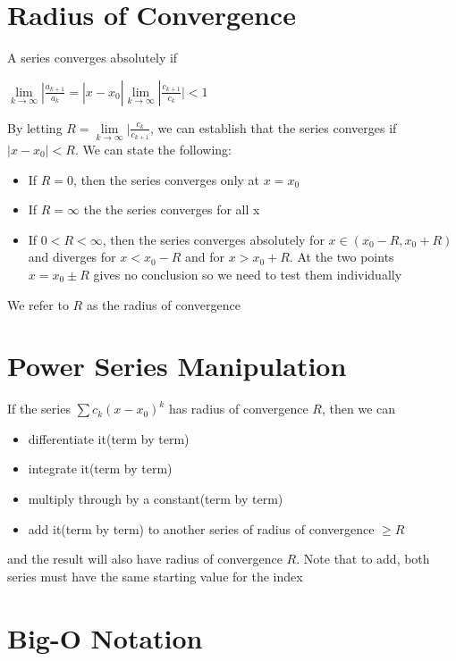 \documentclass[12pt]{report}
\begin{document}
	\section{Radius of Convergence}
		A series converges absolutely if \\
		\centerline{$\lim\limits_{k\rightarrow \infty} |\frac{a_{k+1}}{a_k} = |x-x_0| \lim\limits_{k\rightarrow \infty} |\frac{c_{k+1}}{c_k}| < 1$}
		By letting $R = \lim\limits_{k\rightarrow \infty} |\frac{c_k}{c_{k+1}}$, we can establish that the series converges if $|x - x_0| < R$. We can state the following:
		\begin{itemize}
			\item If $R = 0$, then the series converges only at $x = x_0$
			\item If $R = \infty$ the the series converges for all x
			\item If $0 < R < \infty$, then the series converges absolutely for $x \in (x_0 - R, x_0 + R)$ and diverges for $x < x_0 - R$ and for $x > x_0 + R$. At the two points $x = x_0 \pm R$ gives no conclusion so we need to test them individually
		\end{itemize}
		We refer to $R$ as the radius of convergence
	\section{Power Series Manipulation}
		If the series $\sum c_k (x - x_0)^k$ has radius of convergence $R$, then we can
		\begin{itemize}
			\item differentiate it(term by term)
			\item integrate it(term by term)
			\item multiply through by a constant(term by term)
			\item add it(term by term) to another series of radius of convergence $\geq R$
		\end{itemize}
		and the result will also have radius of convergence $R$. Note that to add, both series must have the same starting value for the index
	\section{Big-O Notation}
\end{document}
